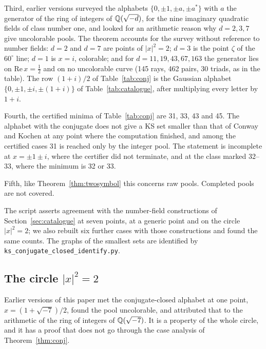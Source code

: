 Third, earlier versions surveyed the alphabets $\{0,\pm1,\pm a,\pm a^{*}\}$ with $a$ the
generator of the ring of integers of $\mathbb{Q}(\sqrt{-d})$, for the nine imaginary quadratic fields
of class number one, and looked for an arithmetic reason why $d=2,3,7$ give uncolorable pools.
The theorem accounts for the survey without reference to number fields: $d=2$ and $d=7$ are
points of $|x|^2=2$; $d=3$ is the point $\zeta$ of the $60^\circ$ line; $d=1$ is $x=i$,
colorable; and for $d=11,19,43,67,163$ the generator lies on $\mathrm{Re}\,x=\tfrac12$ and on no
uncolorable curve (145 rays, 462 pairs, 30 triads, as in the table).  The row $(1+i)/2$ of
Table~\ref{tab:conj} is the Gaussian alphabet $\{0,\pm1,\pm i,\pm(1+i)\}$ of
Table~\ref{tab:catalogue}, after multiplying every letter by $1+i$.

Fourth, the certified minima of Table~\ref{tab:conj} are 31, 33, 43 and 45.  The alphabet with
the conjugate does not give a KS set smaller than that of Conway and Kochen at any point where
the computation finished, and among the certified cases 31 is reached only by the integer pool.
The statement is incomplete at $x=\pm1\pm i$, where the certifier did not terminate, and at the
class marked 32--33, where the minimum is 32 or 33.

Fifth, like Theorem~\ref{thm:twosymbol} this concerns raw pools.  Completed pools are not
covered.

The script asserts agreement with the number-field constructions of
Section~\ref{sec:catalogue} at seven points, at a generic point and on the circle $|x|^2=2$;
we also rebuilt six further cases with those constructions and found the same counts.  The
graphs of the smallest sets are identified by \texttt{ks\_conjugate\_closed\_identify.py}.

\subsection{The circle $|x|^2=2$}\label{sec:circle}

Earlier versions of this paper met the conjugate-closed alphabet at one point,
$x=(1+\sqrt{-7})/2$, found the pool uncolorable, and attributed that to the arithmetic of the
ring of integers of $\mathbb{Q}(\sqrt{-7})$.  It is a property of the whole circle, and it has a proof
that does not go through the case analysis of Theorem~\ref{thm:conj}.

